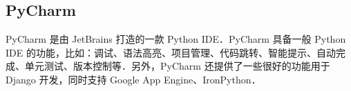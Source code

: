 
\begin{issues}
\issueDraft
\issueTODO
\end{issues}

\subsection{PyCharm}
   PyCharm 是由 JetBrains 打造的一款 Python IDE．PyCharm 具备一般 Python IDE 的功能，比如：调试、语法高亮、项目管理、代码跳转、智能提示、自动完成、单元测试、版本控制等．另外，PyCharm 还提供了一些很好的功能用于 Django 开发，同时支持 Google App Engine、IronPython． 
